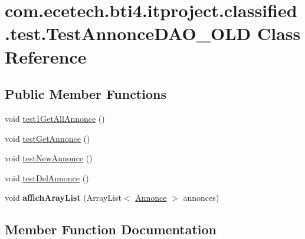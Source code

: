 \hypertarget{classcom_1_1ecetech_1_1bti4_1_1itproject_1_1classified_1_1test_1_1_test_annonce_d_a_o___o_l_d}{}\section{com.\+ecetech.\+bti4.\+itproject.\+classified.\+test.\+Test\+Annonce\+D\+A\+O\+\_\+\+O\+LD Class Reference}
\label{classcom_1_1ecetech_1_1bti4_1_1itproject_1_1classified_1_1test_1_1_test_annonce_d_a_o___o_l_d}
\subsection*{Public Member Functions}
\begin{DoxyCompactItemize}
\item 
void \hyperlink{classcom_1_1ecetech_1_1bti4_1_1itproject_1_1classified_1_1test_1_1_test_annonce_d_a_o___o_l_d_a0706f6146b0b2275164696600037aba5}{test1\+Get\+All\+Annonce} ()
\item 
void \hyperlink{classcom_1_1ecetech_1_1bti4_1_1itproject_1_1classified_1_1test_1_1_test_annonce_d_a_o___o_l_d_a86c3f35fbb03e61420be3821c9479788}{test\+Get\+Annonce} ()
\item 
void \hyperlink{classcom_1_1ecetech_1_1bti4_1_1itproject_1_1classified_1_1test_1_1_test_annonce_d_a_o___o_l_d_aa7fa8649fd76bfd722d43c0f2078ea7b}{test\+New\+Annonce} ()
\item 
void \hyperlink{classcom_1_1ecetech_1_1bti4_1_1itproject_1_1classified_1_1test_1_1_test_annonce_d_a_o___o_l_d_a6d9290cd54b58a7cdeb29a43a37ca417}{test\+Del\+Annonce} ()
\item 
void {\bfseries affich\+Aray\+List} (Array\+List$<$ \hyperlink{classcom_1_1ecetech_1_1bti4_1_1itproject_1_1classified_1_1beans_1_1_annonce}{Annonce} $>$ annonces)\hypertarget{classcom_1_1ecetech_1_1bti4_1_1itproject_1_1classified_1_1test_1_1_test_annonce_d_a_o___o_l_d_a4396368047b48d7259d6d460915dbe95}{}\label{classcom_1_1ecetech_1_1bti4_1_1itproject_1_1classified_1_1test_1_1_test_annonce_d_a_o___o_l_d_a4396368047b48d7259d6d460915dbe95}

\end{DoxyCompactItemize}


\subsection{Member Function Documentation}
